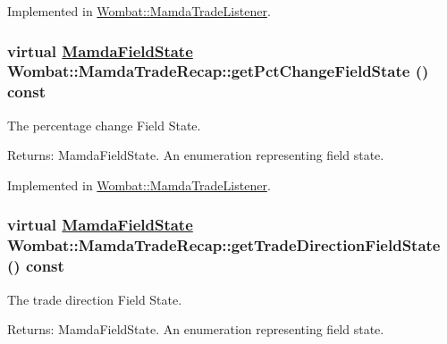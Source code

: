 Implemented in \hyperlink{classWombat_1_1MamdaTradeListener_b147b82694481c48a976dce74b2b0241}{Wombat::Mamda\-Trade\-Listener}.\hypertarget{classWombat_1_1MamdaTradeRecap_83948885b739f36f7e593d8923cb542f}{
\subsubsection[getPctChangeFieldState]{\setlength{\rightskip}{0pt plus 5cm}virtual \hyperlink{namespaceWombat_93aac974f2ab713554fd12a1fa3b7d2a}{Mamda\-Field\-State} Wombat::Mamda\-Trade\-Recap::get\-Pct\-Change\-Field\-State () const}}
\label{classWombat_1_1MamdaTradeRecap_83948885b739f36f7e593d8923cb542f}


The percentage change Field State. 

\begin{Desc}
\item[Returns:]Mamda\-Field\-State. An enumeration representing field state. \end{Desc}


Implemented in \hyperlink{classWombat_1_1MamdaTradeListener_43832d2f10f4757e6ed29c82f875c976}{Wombat::Mamda\-Trade\-Listener}.\hypertarget{classWombat_1_1MamdaTradeRecap_285abbfee630b27b7b20957f35250f19}{
\subsubsection[getTradeDirectionFieldState]{\setlength{\rightskip}{0pt plus 5cm}virtual \hyperlink{namespaceWombat_93aac974f2ab713554fd12a1fa3b7d2a}{Mamda\-Field\-State} Wombat::Mamda\-Trade\-Recap::get\-Trade\-Direction\-Field\-State () const}}
\label{classWombat_1_1MamdaTradeRecap_285abbfee630b27b7b20957f35250f19}


The trade direction Field State. 

\begin{Desc}
\item[Returns:]Mamda\-Field\-State. An enumeration representing field state. \end{Desc}


